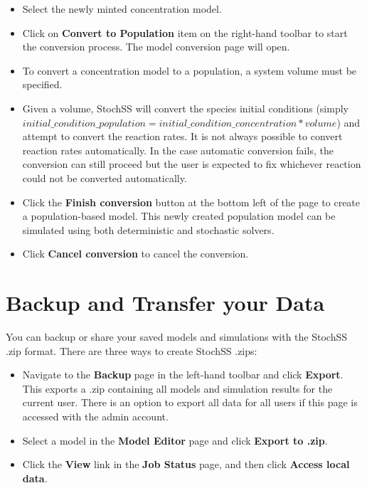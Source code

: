 \begin{itemize}
  \item Select the newly minted concentration model.
  \item Click on \textbf{Convert to Population} item on the right-hand toolbar to start the conversion process. The model conversion page will open.
  \item To convert a concentration model to a population, a system volume must be specified.
  \item Given a volume, StochSS will convert the species initial conditions (simply $initial\_condition\_population = initial\_condition\_concentration * volume$) and attempt to convert the reaction rates. It is not always possible to convert reaction rates automatically. In the case automatic conversion fails, the conversion can still proceed but the user is expected to fix whichever reaction could not be converted automatically.
  \item Click the \textbf{Finish conversion} button at the bottom left of the page to create a population-based model. This newly created population model can be simulated using both deterministic and stochastic solvers.
  \item Click \textbf{Cancel conversion} to cancel the conversion.
\end{itemize}


\section{Backup and Transfer your Data}
You can backup or share your saved models and simulations with the StochSS .zip format. There are three ways to create StochSS .zips:

\begin{itemize}
\item Navigate to the \textbf{Backup} page in the left-hand toolbar and click \textbf{Export}. This exports a .zip containing all models and simulation results for the current user. There is an option to export all data for all users if this page is accessed with the admin account.
\item Select a model in the \textbf{Model Editor} page and click \textbf{Export to .zip}.
\item Click the \textbf{View} link in the \textbf{Job Status} page, and then click \textbf{Access local data}.
\end{itemize}

